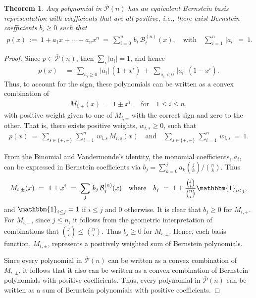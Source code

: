 \documentclass{article}
\newtheorem{theorem}{Theorem}
\begin{document}
\begin{theorem}
Any polynomial in $\overline{\mathcal{P}}(n)$ has an equivalent Bernstein basis representation with coefficients that are all positive, i.e., there exist Bernstein coefficients $b_i\geq 0$ such that
\begin{align}
    p(x)\ :=\ 1 + a_1x + \cdots + a_n x^n\ =\ \sum_{i=0}^n\, b_i\, \mathcal{B}^{(n)}_i(x), \quad\text{with}\quad \sum_{i=1}^n\, |a_i|\ =\ 1.
\end{align}
\end{theorem}
\begin{proof}
Since $p\in \overline{\mathcal{P}}(n)$, then $\sum_i|a_i|=1$, and hence
\begin{align}
    p(x)\ &=\ \sum_{a_i\geq 0}\,|a_i|\,(1 + x^i)\ +\ \sum_{a_i < 0}\,|a_i|\,(1 - x^i).
\end{align}
Thus, to account for the sign, these polynomials can be written as a convex combination of
\begin{align}
    M_{i, \pm}(x)\ =\ 1 \pm x^i,\quad \text{for}\quad 1\leq i\leq n,
\end{align}
with positive weight given to one of $M_{i,\pm}$ with the correct sign and zero to the other. That is, there exists positive weights, $w_{i, s}\geq 0$, such that 
\begin{align}
    p(x)\ =\ \sum_{s\in\{+, -\}}\,\sum_{i=1}^n\, w_{i, s}\, M_{i, s}(x)\quad \text{and}\quad \sum_{s\in\{+, -\}}\, \sum_{i=1}^n\, w_{i, s}\ =\ 1.
\end{align}

From the Binomial and Vandermonde's identity, the monomial coefficients, $a_i$, can be expressed in Bernstein coefficients via $b_j = \sum_{k=0}^j a_k \binom{j}{k} / \binom{n}{k}$. Thus
\begin{align}
    M_{i, \pm}(x)\ =\ 1 \pm x^i\ =\ \sum_{j}\, b_j\, \mathcal{B}^{(n)}_j(x)\quad\text{where}\quad b_j\ =\ 1 \pm \frac{\binom{j}{i}}{\binom{n}{i}}\mathbbm{1}_{i\leq j},
\end{align}
and $\mathbbm{1}_{i\leq j} = 1$ if $i\leq j$ and $0$ otherwise. It is clear that $b_j\geq 0$ for $M_{i, +}$. For $M_{i, -}$, since $j\leq n$, it follows from the geometric interpretation of combinations that $\binom{j}{i}\leq\binom{n}{i}$.
Thus $b_j\geq 0$ for $M_{i, \pm}$. Hence, each basis function, $M_{i, \pm}$, represents a positively weighted sum of Bernstein polynomials.

Since every polynomial in $\overline{\mathcal{P}}(n)$ can be written as a convex combination of $M_{i, \pm}$, it follows that it also can be written as a convex combination of Bernstein polynomials with positive coefficients. Thus, every polynomial in $\overline{\mathcal{P}}(n)$ can be written as a sum of Bernstein polynomials with positive coefficients.
\end{proof}
\end{document}
